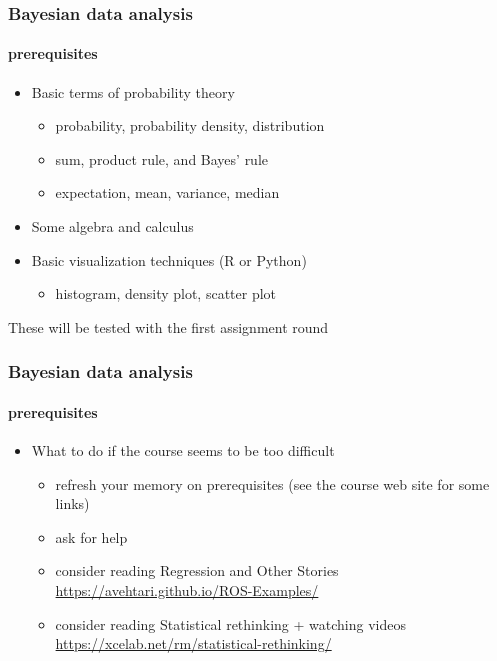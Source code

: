 \documentclass[english,t]{beamer}
\begin{document}
\begin{frame}
  \frametitle{Bayesian data analysis}  %
  \framesubtitle{prerequisites}
  \begin{itemize}
  \item Basic terms of probability theory
    \begin{itemize}
    \item probability, probability density, distribution
    \item sum, product rule, and Bayes' rule
    \item expectation, mean, variance, median
    \end{itemize}
  \item Some algebra and calculus
  \item Basic visualization techniques (R or Python)
    \begin{itemize}
    \item histogram, density plot, scatter plot
    \end{itemize}
  \end{itemize}

  These will be tested with the first assignment round

\end{frame}

\begin{frame}
  \frametitle{Bayesian data analysis}  %
  \framesubtitle{prerequisites}
  \begin{itemize}
  \item What to do if the course seems to be too difficult
    \begin{itemize}
    \item refresh your memory on prerequisites (see the course web
      site for some links)
    \item ask for help
    \item consider reading Regression and Other Stories \url{https://avehtari.github.io/ROS-Examples/}
    \item consider reading Statistical rethinking + watching videos \url{https://xcelab.net/rm/statistical-rethinking/}
    \end{itemize}
  \end{itemize}

\end{frame}
\end{document}

